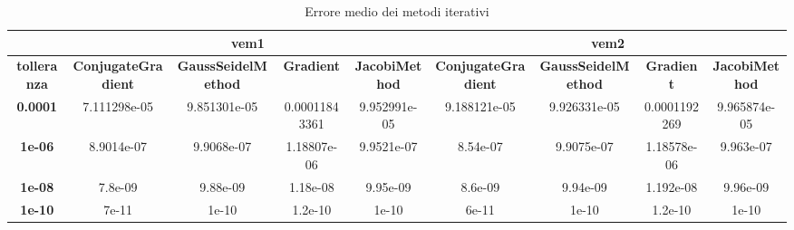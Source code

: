 \begin{table}[!ht]
\begin{subtable}[!ht]{1\textwidth}
{\begin{tabular}{@{}ccccc|cccc@{}}
                \toprule
                \textbf{}                  & \multicolumn{4}{c|}{\textbf{vem1}} & \multicolumn{4}{c}{\textbf{vem2}}                                                                                            \\ \midrule
                \textbf{tolleranza}        &
                \textbf{ConjugateGradient} &
                \textbf{GaussSeidelMethod} &
                \textbf{Gradient}          &
                \textbf{JacobiMethod}      &
                \textbf{ConjugateGradient} &
                \textbf{GaussSeidelMethod} &
                \textbf{Gradient}          &
                \textbf{JacobiMethod}                                                                                                                                                                          \\ \midrule
                \textbf{0.0001}            & 7.111298e-05                       & 9.851301e-05                      & 0.00011843361 & 9.952991e-05 & 9.188121e-05 & 9.926331e-05 & 0.0001192269 & 9.965874e-05 \\
                \textbf{1e-06}             & 8.9014e-07                         & 9.9068e-07                        & 1.18807e-06   & 9.9521e-07   & 8.54e-07     & 9.9075e-07   & 1.18578e-06  & 9.963e-07    \\
                \textbf{1e-08}             & 7.8e-09                            & 9.88e-09                          & 1.18e-08      & 9.95e-09     & 8.6e-09      & 9.94e-09     & 1.192e-08    & 9.96e-09     \\
                \textbf{1e-10}             & 7e-11                              & 1e-10                             & 1.2e-10       & 1e-10        & 6e-11        & 1e-10        & 1.2e-10      & 1e-10        \\ \bottomrule
            \end{tabular}}
        \caption{Vem 1 e Vem 2}
        \label{tab:vem_error}
    \end{subtable}
    \caption{Errore medio dei metodi iterativi}
    \label{tab:erors}
\end{table}
